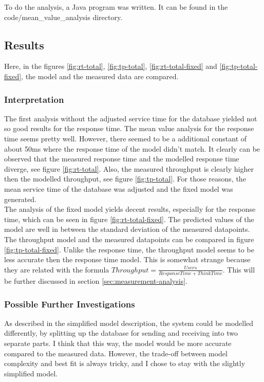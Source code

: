 \documentclass[a4paper]{article}
\begin{document}
To do the analysis, a Java program was written. It can be found in the code/mean\_value\_analysis directory.\\

\subsection{Results}

Here, in the figures \ref{fig:rt-total}, \ref{fig:tp-total}, \ref{fig:rt-total-fixed} and \ref{fig:tp-total-fixed}, the model and the measured data are compared.

\subsubsection{Interpretation}

The first analysis without the adjusted service time for the database yielded not so good results for the response time. The mean value analysis for the response time seems pretty well. However, there seemed to be a additional constant of about 50ms where the response time of the model didn't match. It clearly can be observed that the measured response time and the modelled response time diverge, see figure \ref{fig:rt-total}. Also, the measured throughput is clearly higher then the modelled throughput, see figure \ref{fig:tp-total}. For those reasons, the mean service time of the database was adjusted and the fixed model was generated.\\

The analysis of the fixed model yields decent results, especially for the response time, which can be seen in figure \ref{fig:rt-total-fixed}. The predicted values of the model are well in between the standard deviation of the measured datapoints.\\

The throughput model and the measured datapoints can be compared in figure \ref{fig:tp-total-fixed}. Unlike the response time, the throughput model seems to be less accurate then the response time model. This is somewhat strange because they are related with the formula $Throughput=\frac{Users}{ResponseTime + ThinkTime}$. This will be further discussed in section \ref{sec:measurement-analysis}.


\subsubsection{Possible Further Investigations}

As described in the simplified model description, the system could be modelled differently, by splitting up the database for sending and receiving into two separate parts. I think that this way, the model would be more accurate compared to the measured data. However, the trade-off between model complexity and best fit is always tricky, and I chose to stay with the slightly simplified model.
\end{document}
